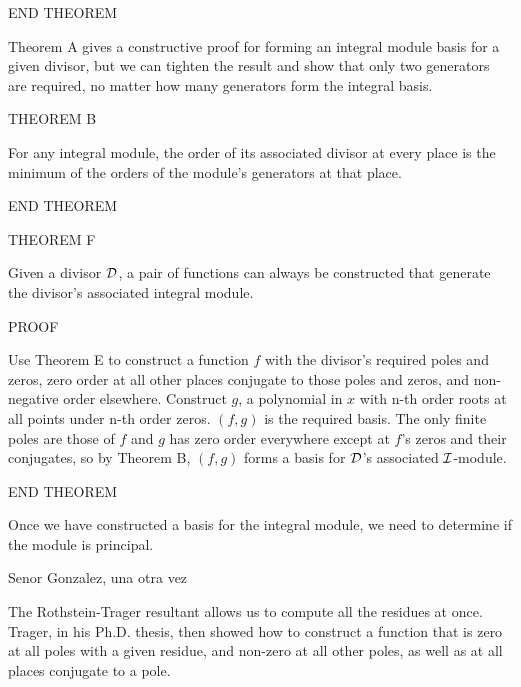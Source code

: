 END THEOREM

Theorem A gives a constructive proof for forming an integral module
basis for a given divisor, but we can tighten the result and show that
only two generators are required, no matter how many generators form
the integral basis.

THEOREM B

For any integral module, the order of its associated divisor at every
place is the minimum of the orders of the module's generators at that
place.

END THEOREM

THEOREM F

Given a divisor ${\cal D}$, a pair of functions can always be
constructed that generate the divisor's associated integral module.

PROOF

Use Theorem E to construct a function $f$ with the divisor's required
poles and zeros, zero order at all other places conjugate to those
poles and zeros, and non-negative order elsewhere.  Construct $g$, a
polynomial in $x$ with n-th order roots at all points under n-th order
zeros.  $(f,g)$ is the required basis.  The only finite poles are
those of $f$ and $g$ has zero order everywhere except at $f$'s zeros
and their conjugates, so by Theorem B, $(f,g)$ forms a basis for
${\cal D}$'s associated ${\cal I}$-module.

END THEOREM

Once we have constructed a basis for the integral module, we need to
determine if the module is principal.



Senor Gonzalez, una otra vez

The Rothstein-Trager resultant allows us to compute all the residues
at once.  Trager, in his Ph.D. thesis, then showed how to construct a
function that is zero at all poles with a given residue, and non-zero
at all other poles, as well as at all places conjugate to a pole.
